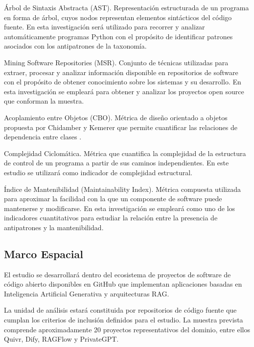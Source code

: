 \begin{description}
    \item Árbol de Sintaxis Abstracta (AST). Representación estructurada de un programa en forma de árbol, cuyos nodos representan elementos sintácticos del código fuente. En esta investigación será utilizado para recorrer y analizar automáticamente programas Python con el propósito de identificar patrones asociados con los antipatrones de la taxonomía.

    \item Mining Software Repositories (MSR). Conjunto de técnicas utilizadas para extraer, procesar y analizar información disponible en repositorios de software con el propósito de obtener conocimiento sobre los sistemas y su desarrollo. En esta investigación se empleará para obtener y analizar los proyectos open source que conforman la muestra.

    \item Acoplamiento entre Objetos (CBO). Métrica de diseño orientado a objetos propuesta por Chidamber y Kemerer que permite cuantificar las relaciones de dependencia entre clases \cite{chidamber_metrics_1994}.

    \item Complejidad Ciclomática. Métrica que cuantifica la complejidad de la estructura de control de un programa a partir de sus caminos independientes. En este estudio se utilizará como indicador de complejidad estructural.

    \item Índice de Mantenibilidad (Maintainability Index). Métrica compuesta utilizada para aproximar la facilidad con la que un componente de software puede mantenerse y modificarse. En esta investigación se empleará como uno de los indicadores cuantitativos para estudiar la relación entre la presencia de antipatrones y la mantenibilidad.
\end{description}
 
\subsection{Marco Espacial}
 
El estudio se desarrollará dentro del ecosistema de proyectos de software de código abierto disponibles en GitHub que implementan aplicaciones basadas en Inteligencia Artificial Generativa y arquitecturas RAG.

La unidad de análisis estará constituida por repositorios de código fuente que cumplan los criterios de inclusión definidos para el estudio. La muestra prevista comprende aproximadamente 20 proyectos representativos del dominio, entre ellos Quivr, Dify, RAGFlow y PrivateGPT.

